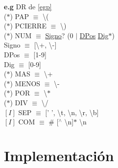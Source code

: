 \documentclass[\main/Apuntes_PL.tex]{subfiles}
\begin{document}
      \bigskip
      \par
      \textbf{e.g}  DR de \cref{egp}\\
      \hspace{5mm}($\ast$) PAP $\equiv$ \textbackslash( \\
      \hspace{5mm}($\ast$) PCIERRE $\equiv$ \textbackslash) \\
      \hspace{5mm}($\ast$) NUM $\equiv$ \underline{Signo}? (0 $\mid$ \underline{DPos} \underline{Dig}$\ast$) \\
      \hspace{10mm} Signo $\equiv$ [\textbackslash+, \textbackslash-] \\
      \hspace{10mm} DPos  $\equiv$ [1-9] \\
      \hspace{10mm} Dig   $\equiv$ [0-9] \\
      \hspace{5mm}($\ast$) MAS $\equiv$ \textbackslash + \\
      \hspace{5mm}($\ast$) MENOS $\equiv$ \textbackslash - \\
      \hspace{5mm}($\ast$) POR $\equiv$ \textbackslash $\ast$ \\
      \hspace{5mm}($\ast$) DIV $\equiv$ \textbackslash / \\
      \hspace{5mm}$[I]$ SEP $\equiv$ $[$' ', \textbackslash t, \textbackslash n, \textbackslash r, \textbackslash b]\\
      \hspace{5mm}$[I]$ COM $\equiv$ \# [$^\wedge$ \textbackslash n]$\ast$ \textbackslash n

  \section{Implementación}
\end{document}
